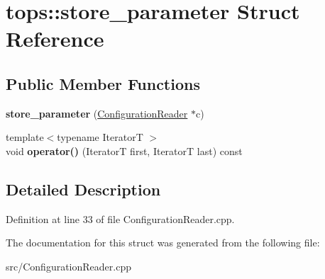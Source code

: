 \hypertarget{structtops_1_1store__parameter}{}\section{tops\+:\+:store\+\_\+parameter Struct Reference}
\label{structtops_1_1store__parameter}
\subsection*{Public Member Functions}
\begin{DoxyCompactItemize}
\item 
\mbox{\label{structtops_1_1store__parameter_a3b4ead809b1107618d81107a10f992f1}} 
{\bfseries store\+\_\+parameter} (\hyperlink{classtops_1_1ConfigurationReader}{Configuration\+Reader} $\ast$c)
\item 
\mbox{\label{structtops_1_1store__parameter_ae3717168879b5d49242eb3f00eac230c}} 
{\footnotesize template$<$typename IteratorT $>$ }\\void {\bfseries operator()} (IteratorT first, IteratorT last) const
\end{DoxyCompactItemize}


\subsection{Detailed Description}


Definition at line 33 of file Configuration\+Reader.\+cpp.



The documentation for this struct was generated from the following file\+:\begin{DoxyCompactItemize}
\item 
src/Configuration\+Reader.\+cpp\end{DoxyCompactItemize}
